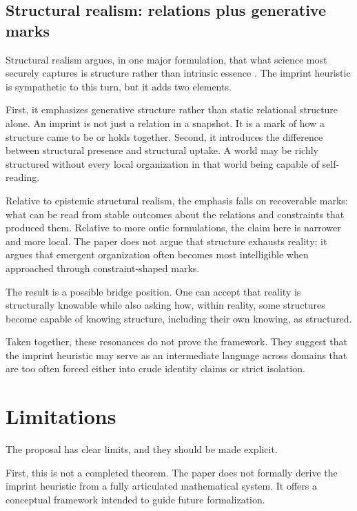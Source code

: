 \documentclass[12pt,a4paper]{article}
\begin{document}
\subsection{Structural realism: relations plus generative marks}

Structural realism argues, in one major formulation, that what science most securely captures is structure rather than intrinsic essence \cite{Ladyman2007,French2014}. The imprint heuristic is sympathetic to this turn, but it adds two elements.

First, it emphasizes generative structure rather than static relational structure alone. An imprint is not just a relation in a snapshot. It is a mark of how a structure came to be or holds together. Second, it introduces the difference between structural presence and structural uptake. A world may be richly structured without every local organization in that world being capable of self-reading.

Relative to epistemic structural realism, the emphasis falls on recoverable marks: what can be read from stable outcomes about the relations and constraints that produced them. Relative to more ontic formulations, the claim here is narrower and more local. The paper does not argue that structure exhausts reality; it argues that emergent organization often becomes most intelligible when approached through constraint-shaped marks.

The result is a possible bridge position. One can accept that reality is structurally knowable while also asking how, within reality, some structures become capable of knowing structure, including their own knowing, as structured.

Taken together, these resonances do not prove the framework. They suggest that the imprint heuristic may serve as an intermediate language across domains that are too often forced either into crude identity claims or strict isolation.

\section{Limitations}

The proposal has clear limits, and they should be made explicit.

First, this is not a completed theorem. The paper does not formally derive the imprint heuristic from a fully articulated mathematical system. It offers a conceptual framework intended to guide future formalization.
\end{document}
